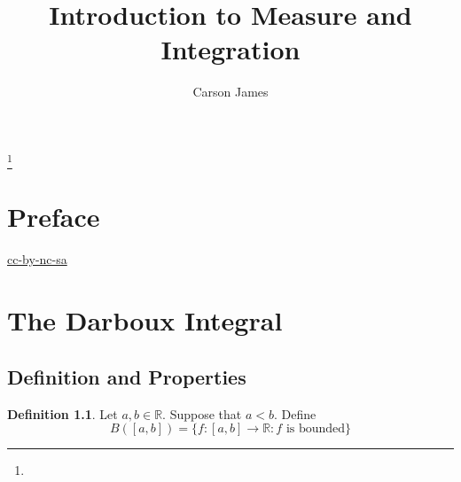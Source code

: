 \documentclass{book}
\theoremstyle{definition}
\newtheorem{defn}[definition]{Definition}
\newcommand{\R}{\mathbb{R}}
\newcommand{\ld}[1]{\label{defn:#1}}
\DeclareMathOperator*{\0}{\mbf{0}}
\DeclareMathOperator*{\1}{\mbf{1}}
\begin{document}
	
	\frontmatter
	
	\title{Introduction to Measure and Integration}
	
	
	\author{Carson James}
	\thanks{}
	
	\date{}
	
	\maketitle
	
	
	\setcounter{page}{4}
	
	\tableofcontents
	\printunsrtglossary[type=symbols,style=long,title={Notation}]
	
	
	\mainmatter
	
	\chapter*{Preface}
	
	\begin{flushleft}
		\href{https://creativecommons.org/licenses/by-nc-sa/4.0/legalcode.txt}{cc-by-nc-sa}
	\end{flushleft}

	\newpage
	
	
	
	
	
	
	
	
	
	
	
	
	\chapter{The Darboux Integral}
	
	\section{Definition and Properties}
	\begin{defn} \ld{00000} 
		Let $a,b \in \R$. Suppose that $a<b$. Define $$B([a,b]) = \{f:[a,b] \rightarrow \R: f\text{ is bounded}\}$$
	\end{defn}
	
\end{document}
